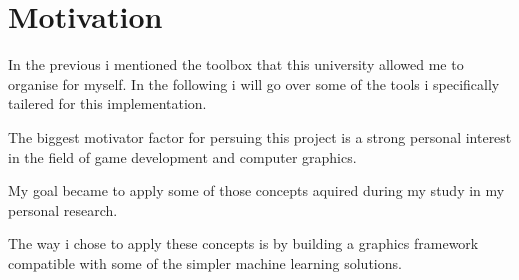 
\chapter*{Motivation}

  In the previous i mentioned the toolbox that this university allowed me to organise for myself. In the following i will go over some of the tools i specifically tailered for this implementation.

  The biggest motivator factor for persuing this project is a strong personal interest in the field of game development and computer graphics.

  My goal became to apply some of those concepts aquired during my study in my personal research.

  The way i chose to apply these concepts is by building a graphics framework compatible with some of the simpler machine learning solutions.


